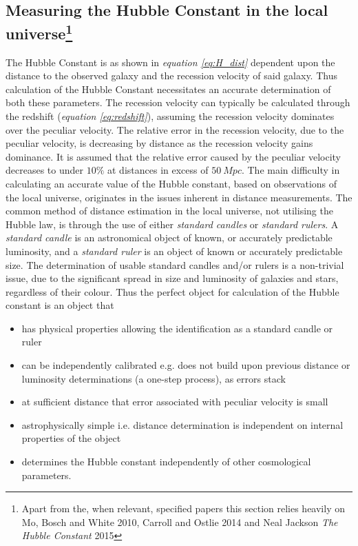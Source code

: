 \documentclass[a4paper, 12pt, twoside]{article}
\begin{document}
\subsection[Measuring the Hubble Constant in the local universe]{Measuring the Hubble Constant in the local universe\footnote{Apart from the, when relevant, specified papers this section relies heavily on Mo, Bosch and White 2010, Carroll and Ostlie 2014 and Neal Jackson \emph{The Hubble Constant} 2015}} \label{hubble_local}
The Hubble Constant is as shown in \emph{equation \ref{eq:H_dist}} dependent upon the distance to the observed galaxy and the recession velocity of said galaxy. Thus calculation of the Hubble Constant necessitates an accurate determination of both these parameters. The recession velocity can typically be calculated through the redshift (\emph{equation \ref{eq:redshift}}), assuming the recession velocity dominates over the peculiar velocity. The relative error in the recession velocity, due to the peculiar velocity, is decreasing by distance as the recession velocity gains dominance. It is assumed that the relative error caused by the peculiar velocity decreases to under $10\%$ at distances in excess of $50\ Mpc$. The main difficulty in calculating an accurate value of the Hubble constant, based on observations of the local universe, originates in the issues inherent in distance measurements. The common method of distance estimation in the local universe, not utilising the Hubble law, is through the use of either \emph{standard candles} or \emph{standard rulers}. A \emph{standard candle} is an astronomical object of known, or accurately predictable luminosity, and a \emph{standard ruler} is an object of known or accurately predictable size. The determination of usable standard candles and/or rulers is a non-trivial issue, due to the significant spread in size and luminosity of galaxies and stars, regardless of their colour. Thus the perfect object for calculation of the Hubble constant is an object that
\begin{itemize}
\item has physical properties allowing the identification as a standard candle or ruler
\item can be independently calibrated e.g. does not build upon previous distance or luminosity determinations (a one-step process), as errors stack
\item at sufficient distance that error associated with peculiar velocity is small
\item astrophysically simple i.e. distance determination is independent on internal properties of the object
\item determines the Hubble constant independently of other cosmological parameters.
\end{itemize}
\end{document}
